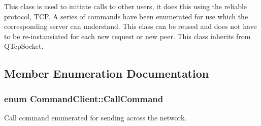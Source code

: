 \-This class is used to initiate calls to other users, it does this using the reliable protocol, \-T\-C\-P. \-A series of commands have been enumerated for use which the corresponding server can understand. \-This class can be reused and does not have to be re-\/instansiated for each new request or new peer. \-This class inherits from \-Q\-Tcp\-Socket. 

\subsection{\-Member \-Enumeration \-Documentation}
\hypertarget{class_command_client_aa99b17193724fef8aed2b2c724b0c243}{
\subsubsection[{\-Call\-Command}]{\setlength{\rightskip}{0pt plus 5cm}enum {\bf \-Command\-Client\-::\-Call\-Command}}}
\label{class_command_client_aa99b17193724fef8aed2b2c724b0c243}


\-Call command enumerated for sending across the network. 

